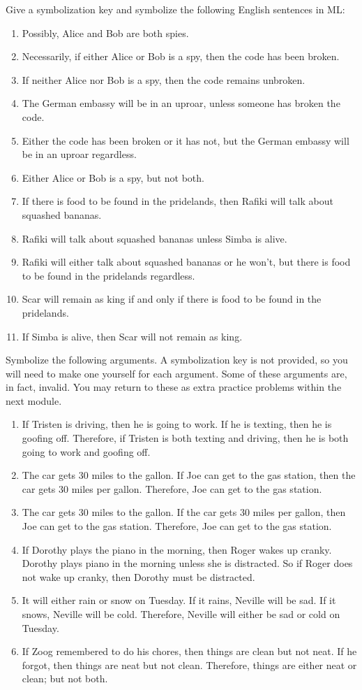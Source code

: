 \problempart
Give a symbolization key and symbolize the following English sentences in ML:
\begin{enumerate}
\item Possibly, Alice and Bob are both spies.
\item Necessarily, if either Alice or Bob is a spy, then the code has been broken.
\item If neither Alice nor Bob is a spy, then the code remains unbroken.
\item The German embassy will be in an uproar, unless someone has broken the code.
\item Either the code has been broken or it has not, but the German embassy will be in an uproar regardless.
\item Either Alice or Bob is a spy, but not both.
\item If there is food to be found in the pridelands, then Rafiki will talk about squashed bananas.
\item Rafiki will talk about squashed bananas unless Simba is alive.
\item Rafiki will either talk about squashed bananas or he won't, but there is food to be found in the pridelands regardless.
\item Scar will remain as king if and only if there is food to be found in the pridelands.
\item If Simba is alive, then Scar will not remain as king.
\end{enumerate}

\problempart
Symbolize the following arguments. A symbolization key is not provided, so you will need to make one yourself for each argument. Some of these arguments are, in fact, invalid. You may return to these as extra practice problems within the next module.
\begin{enumerate}
\item If Tristen is driving, then he is going to work. If he is texting, then he is goofing off. Therefore, if Tristen is both texting and driving, then he is both going to work and goofing off.
\item The car gets 30 miles to the gallon. If Joe can get to the gas station, then the car gets 30 miles per gallon. Therefore, Joe can get to the gas station.
\item The car gets 30 miles to the gallon. If the car gets 30 miles per gallon, then Joe can get to the gas station. Therefore, Joe can get to the gas station.
\item If Dorothy plays the piano in the morning, then Roger wakes up cranky. Dorothy plays piano in the morning unless she is distracted. So if Roger does not wake up cranky, then Dorothy must be distracted.
\item It will either rain or snow on Tuesday. If it rains, Neville will be sad. If it snows, Neville will be cold. Therefore, Neville will either be sad or cold on Tuesday.
\item If Zoog remembered to do his chores, then things are clean but not neat. If he forgot, then things are neat but not clean. Therefore, things are either neat or clean; but not both.
\end{enumerate}
\setcounter{seccount}{1}
